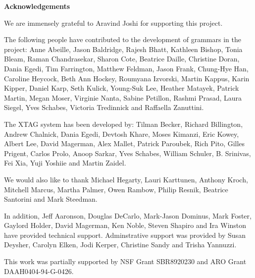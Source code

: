 \pagestyle{plain}
\null\vfil
\begin{center}
{\bf Acknowledgements}
\end{center}
\setcounter{page}{0}

We are immensely grateful to Aravind Joshi for supporting this
project. 

The following people have contributed to the development of grammars in the
project: Anne Abeille, Jason Baldridge, Rajesh Bhatt, Kathleen Bishop, Tonia
Bleam, Raman Chandrasekar, Sharon Cote, Beatrice Daille, Christine Doran, Dania
Egedi, Tim Farrington, Matthew Feldman, Jason Frank, Chung-Hye Han, Caroline
Heycock, Beth Ann Hockey, Roumyana Izvorski, Martin Kappus, Karin Kipper,
Daniel Karp, Seth Kulick, Young-Suk Lee, Heather Matayek, Patrick Martin, Megan
Moser, Virginie Nanta, Sabine Petillon, Rashmi Prasad, Laura Siegel, Yves
Schabes, Victoria Tredinnick and Raffaella Zanuttini.

The XTAG system has been developed by: Tilman Becker, Richard Billington,
Andrew Chalnick, Dania Egedi, Devtosh Khare, Moses Kimanzi, Eric Kowey,
Albert Lee, David Magerman, Alex Mallet, Patrick Paroubek, Rich Pito,
Gilles Prigent, Carlos Prolo, Anoop Sarkar, Yves Schabes, William Schuler,
B. Srinivas, Fei Xia, Yuji Yoshiie and Martin Zaidel.

We would also like to thank Michael Hegarty, Lauri Karttunen, Anthony
Kroch, Mitchell Marcus, Martha Palmer, Owen Rambow, Philip Resnik,
Beatrice Santorini and Mark Steedman.

In addition, Jeff Aaronson, Douglas DeCarlo, Mark-Jason Dominus, Mark
Foster, Gaylord Holder, David Magerman, Ken Noble, Steven Shapiro and
Ira Winston have provided technical support.  Adminstrative support
was provided by Susan Deysher, Carolyn Elken, Jodi Kerper, Christine
Sandy and Trisha Yannuzzi.

This work was partially supported by  NSF Grant SBR8920230 and ARO Grant
DAAH0404-94-G-0426. 

\newpage

